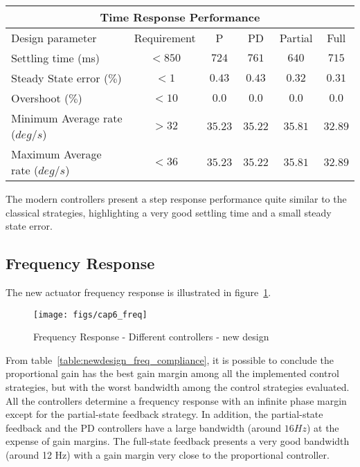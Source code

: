 \begin{table}[H]
    \label{table:newdesign_time_compliance}
	\centering
	\resizebox{16cm}{!} {
    \begin{tabular}{|l|c|c|c|c|c|}
    \hline
    \multicolumn{6}{|c|}{Time Response Performance} \\ \hline
    Design parameter & Requirement & P & PD & Partial & Full \\ \hline
    Settling time (ms) & $ < 850 $ & $724$ & $761$ & $640$ & $715$ \\ \hline
    Steady State error ($\%$) & $< 1$ & $0.43$ & $0.43$ & $0.32$ & $0.31$   \\ \hline
    Overshoot ($\%$) & $< 10 $  & $0.0$ & $0.0$ & $0.0$ & $0.0$  \\ \hline
    Minimum Average rate ($deg/s$) & $> 32$ & $35.23$ & $35.22$ & $35.81$ & $32.89$ \\ \hline
    Maximum Average rate ($deg/s$) & $< 36$ & $35.23$ & $35.22$ & $35.81$ & $32.89$   \\ \hline
    \end{tabular}}

\end{table}

The modern controllers present a step response performance quite similar to the classical strategies, highlighting a very good settling time and a small steady state error.

\subsection{Frequency Response}

The new actuator frequency response is illustrated in figure~\ref{fig:freq_newdesign}.

\begin{figure}[H]
\centering
\texttt{[image: figs/cap6\_freq]}
\caption{Frequency Response - Different controllers - new design}
\label{fig:freq_newdesign}
\end{figure}

From table~\ref{table:newdesign_freq_compliance}, it is possible to conclude the proportional gain has the best gain margin among all the implemented control strategies, but with the worst bandwidth among the control strategies evaluated. All the controllers determine a frequency response with an infinite phase margin except for the partial-state feedback strategy. In addition, the partial-state feedback and the PD controllers have a large bandwidth (around $16 Hz$) at the expense of gain margins. The full-state feedback presents a very good bandwidth (around 12 Hz) with a gain margin very close to the proportional controller.

